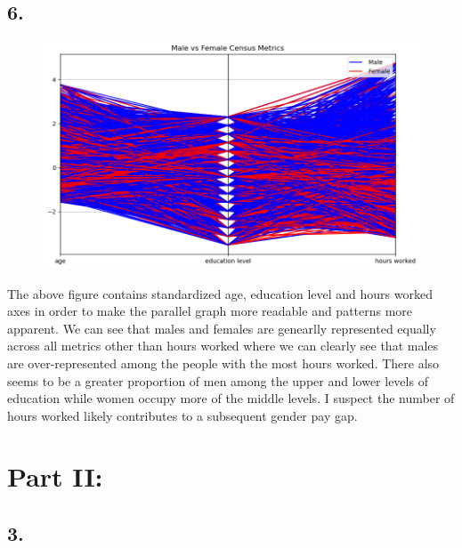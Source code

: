 \documentclass{article}
\begin{document}
    \newpage

    \subsection*{6.}

    \begin{center}
        \begin{minipage}[t]{0.9\textwidth}
            \begin{figure}[H]
                \centering
                \includegraphics[width=1\textwidth, height=0.4\textheight]{./1_6a.png}
            \end{figure}
            The above figure contains standardized age, education level and hours worked axes
            in order to make the parallel graph more readable and patterns more apparent.
            We can see that males and females are genearlly represented equally across all metrics
            other than hours worked where we can clearly see that males are over-represented
            among the people with the most hours worked. There also seems to be a greater
            proportion of men among the upper and lower levels of education while women occupy
            more of the middle levels. I suspect the number of hours worked likely contributes
            to a subsequent gender pay gap. 
        \end{minipage}
    \end{center}

    \newpage

    \section*{Part II:}

    \subsection*{3.}
\end{document}
